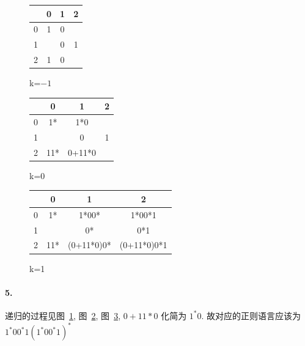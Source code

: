 \documentclass[12pt]{ctexart}
\theoremstyle{definition}
\theoremstyle{definition}
\theoremstyle{plain}
\theoremstyle{remark}
\begin{document}
\begin{figure}
\centering
\begin{tabular}{c|c|c|c} \hline 
	 &0&1&2\\\hline
	0&1&0& \\\hline
	1& &0&1\\\hline
	2&1&0 & \\\hline  
\end{tabular}\caption{k=\(-1\)}\label{tab:k=-1}
\end{figure}

\begin{figure}
\centering
\begin{tabular}{c|c|c|c} \hline 
	 &0&1&2\\\hline
	0&1*&1*0& \\\hline
	1&&0&1\\\hline
	2&11*&0+11*0&\\\hline  
\end{tabular}\caption{k=0}\label{tab:k=0}
\end{figure}
\begin{figure}
\centering
\begin{tabular}{c|c|c|c} \hline 
	 &0&1&2\\\hline
	0&1*&1*00*&1*00*1\\\hline
	1&&0*&0*1 \\\hline
	2&11*&(0+11*0)0*&(0+11*0)0*1\\\hline  
\end{tabular}\caption{k=1}\label{tab:k=1}
\end{figure}

\paragraph{5.} 
递归的过程见图~\ref{tab:k=-1}, 图~\ref{tab:k=0}, 图~\ref{tab:k=1},
\(0+ 11 * 0 \) 化简为 \(1 ^{*}0\). 
故对应的正则语言应该为 \(1 ^{*} 0 0 ^{*} 1(1^{*}0 0 ^{*} 1 )^{*}\)
\end{document}
